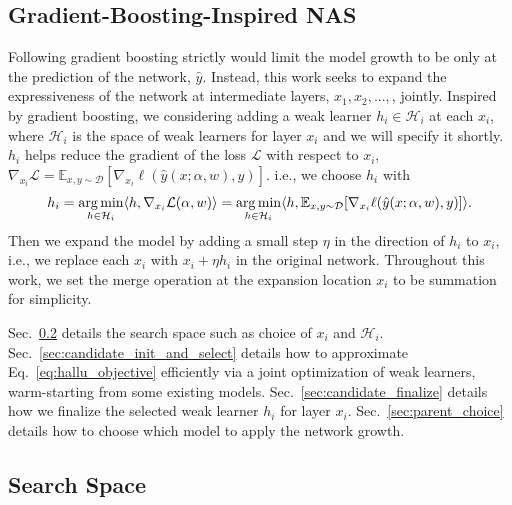 \subsection{Gradient-Boosting-Inspired NAS}
\label{sec:gb_nas}
Following gradient boosting strictly would limit the model growth to be only at the prediction of the network, $\hat{y}$. 
Instead, this work seeks to expand the expressiveness of the network at intermediate layers, $x_1, x_2,...,$, jointly.
Inspired by gradient boosting, we considering adding a weak learner $h_i \in \mathcal{H}_i$ at each $x_i$, where 
$\mathcal{H}_i$ is the space of weak learners for layer $x_i$ and we will specify it shortly. 
$h_i$ helps reduce the gradient of the loss $\mathcal{L}$ with respect to $x_i$, $\nabla _{x_i} \mathcal{L}  = \mathbb{E} _{x, y \sim \mathcal{D}} [ \nabla _{x_{i}} \ell(\hat{y}(x ; \alpha, w), y) ]$.
i.e., we choose $h_i$ with 
\begin{align}
h_i = \operatorname*{arg\,min} _{h \in \mathcal{H}_i} \langle h, 
\nabla _{x_i} \mathcal{L} (\alpha, w) \rangle = 
\operatorname*{arg\,min} _{h\in \mathcal{H}_i} \langle h, \mathbb{E} _{x, y \sim \mathcal{D}} [ \nabla _{x_{i}} \ell(\hat{y}(x ; \alpha, w), y) ] \rangle.
\label{eq:hallu_objective}
\end{align}
Then we expand the model by adding a small step $\eta$ in the direction of $h_i$ to $x_i$, i.e., we replace each $x_i$ with $x_i + \eta h_i$ in the original network.
Throughout this work, we set the merge operation at the expansion location $x_i$ to be summation for simplicity.

Sec.~\ref{sec:search_space} details the search space such as choice of $x_i$ and $\mathcal{H}_i$. 
Sec.~\ref{sec:candidate_init_and_select} details how to approximate Eq.~\ref{eq:hallu_objective} efficiently via 
a joint optimization of weak learners, warm-starting from some existing models.
Sec.~\ref{sec:candidate_finalize} details how we finalize the selected weak learner $h_i$ for layer $x_i$.
Sec.~\ref{sec:parent_choice} details how to choose which model to apply the network growth.



\subsection{Search Space}
\label{sec:search_space}

